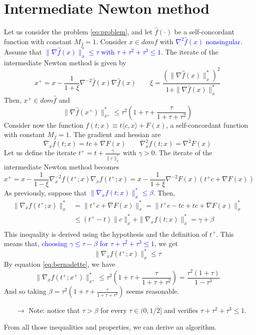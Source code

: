 \documentclass[12pt, openany]{report}
\theoremstyle{definition}
\begin{document}
\section{Intermediate Newton method}
Let us consider the problem \eqref{eq:problem}, and let $\hat f(\cdot)$ be a self-concordant function with constant $M_{\hat f} = 1$. Consider $x\in dom\hat f$ with \textcolor{blue}{$\nabla^2\hat f(x)$ nonsingular}. Assume that \textcolor{blue}{$\|\nabla \hat f(x)\|_x^* \le \tau$ with $\tau+\tau^2 +\tau^3\le 1$}. The iterate of the intermediate Newton method is given by 
\begin{equation}
	x^+ = x - \frac{1}{1+\xi} \nabla^{-2}\hat f(x)\nabla \hat f(x) \qquad \xi = \frac{(\|\nabla \hat f(x)\|_x^*)^2}{1+\|\nabla \hat f(x)\|_x^*}
\end{equation}
Then, $x^+\in dom\hat f$ and 
\begin{equation}\label{eq:bernadette}
	\|\nabla \hat f(x^+)\|_{x^+}^* \le \tau^2\left(1+\tau+\frac{\tau}{1+\tau+\tau^2}\right)
\end{equation}
Consider now the function $f(t;x) \equiv t\langle c,x\rangle + F(x)$, a self-concordant function with constant $M_f=1$. The gradient and hessian are 
\begin{equation}
	\nabla_x f(t;x) = tc + \nabla F(x) \qquad \nabla^2_x f(t;x) = \nabla^2F(x)
\end{equation}
Let us define the iterate $t^+ = t + \frac{\gamma}{\|c\|_x^*}$ with $\gamma>0$. The iterate of the intermediate Newton method becomes
\begin{equation}
	x^+ = x - \frac{1}{1-\xi}\nabla^{-2}_xf(t^+;x)\nabla_xf(t^+; x) = x-\frac{1}{1+\xi}\nabla^{-2}F(x)(t^+ c + \nabla F(x))
\end{equation}
As previously, suppose that \textcolor{blue}{$\|\nabla_x f(t;x)\|_x^* \le \beta$}. Then, 
\begin{equation}
	\begin{aligned}
		\|\nabla_xf(t^+;x)\|_x^* & = \|t^+c + \nabla F(x)\|_x^* = \|t^+c-tc+tc + \nabla F(x)\|_x^*\\
		& \le (t^+-t)\|c\|_x^* + \|\nabla_xf(t;x)\|_x^* = \gamma +\beta\\
	\end{aligned}
\end{equation}
This inequality is derived using the hypothesis and the definition of $t^+$. This means that, \textcolor{blue}{choosing $\gamma \le \tau - \beta$ for $\tau+\tau^2+\tau^3\le 1$}, we get 
\begin{equation}
	\| \nabla_x f(t^+;x)\|_x^* \le \tau
\end{equation}
By equation \eqref{eq:bernadette}, we have
\begin{equation}
	\|\nabla_x f(t^+; x^+)\|_{x^+}^* \le \tau^2\left(1+\tau+\frac{\tau}{1+\tau+\tau^2}\right) = \frac{\tau^2(1+\tau)}{1-\tau^3}
\end{equation}
And so taking $\beta = \tau^2 \left(1+\tau+\frac{\tau}{1+\tau+\tau^2}\right)$ seems reasonable. 
\begin{itemize}
	\item [$\to$] Note: notice that $\tau>\beta$ for every $\tau\in (0,1/2]$ and verifies $\tau+\tau^2+\tau^3\le 1$.
\end{itemize}
From all those inequalities and properties, we can derive an algorithm. 
\end{document}
